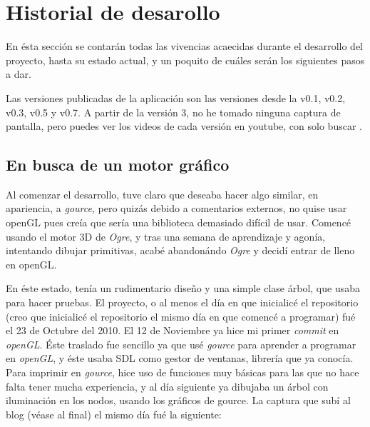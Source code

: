 %


\section{Historial de desarollo}
\label{sec:desarrollo}

En ésta sección se contarán todas las vivencias acaecidas durante el
desarrollo del proyecto, hasta su estado actual, y un poquito de
cuáles serán los siguientes pasos a dar.

Las versiones publicadas de la aplicación son las versiones desde la
v0.1, v0.2, v0.3, v0.5 y v0.7. A partir de la versión 3, no he tomado
ninguna captura de pantalla, pero puedes ver los videos de cada
versión en youtube, con solo buscar \fpt.

\subsection{En busca de un motor gráfico}
Al comenzar el desarrollo, tuve claro que deseaba hacer algo similar,
en apariencia, a \textit{gource}, pero quizás debido a comentarios
externos, no quise usar openGL pues creía que sería una biblioteca
demasiado difícil de usar. Comencé usando el motor 3D de
\textit{Ogre}, y tras una semana de aprendizaje y agonía, intentando
dibujar primitivas, acabé abandonándo \textit{Ogre} y decidí entrar de
lleno en openGL.

En éste estado, tenía un rudimentario diseño y una simple clase árbol,
que usaba para hacer pruebas. El proyecto, o al menos el día en que
inicialicé el repositorio (creo que inicialicé el repositorio el mismo
día en que comencé a programar) fué el 23 de Octubre del 2010. El 12
de Noviembre ya hice mi primer \textit{commit} en \textit{openGL}. Éste traslado
fue sencillo ya que usé \textit{gource} para aprender a programar en
\textit{openGL}, y éste usaba SDL como gestor de ventanas, librería
que ya conocía. Para imprimir en \textit{gource}, hice uso de
funciones muy básicas para las que no hace falta tener mucha
experiencia, y al día siguiente ya dibujaba un árbol con iluminación
en los nodos, usando los gráficos de gource. La captura que subí al
blog (véase al final) el mismo día fué la siguiente:

